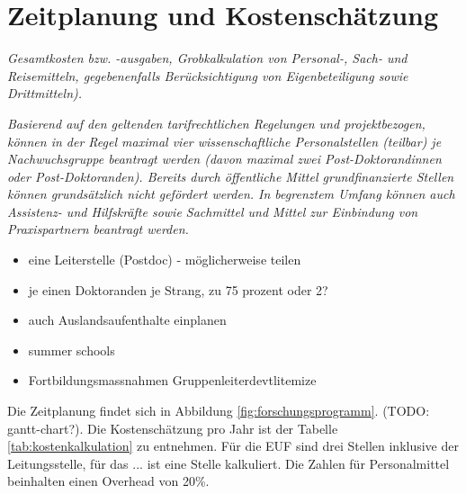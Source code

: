 \documentclass[a4paper,11pt,twoside]{scrartcl}
\begin{document}
\section{Zeitplanung und Kostenschätzung}
\textit{Gesamtkosten bzw. -ausgaben, Grobkalkulation von Personal-, Sach- und Reisemitteln, gegebenenfalls Berücksichtigung von Eigenbeteiligung sowie Drittmitteln).}

\textit{Basierend auf den geltenden tarifrechtlichen Regelungen und projektbezogen, können in der Regel maximal vier wissenschaftliche Personalstellen (teilbar) je Nachwuchsgruppe beantragt werden (davon maximal zwei Post-Doktorandinnen oder Post-Doktoranden). Bereits durch öffentliche Mittel grundfinanzierte Stellen können grundsätzlich nicht gefördert werden.
In begrenztem Umfang können auch Assistenz- und Hilfskräfte sowie Sachmittel und Mittel zur Einbindung von Praxispartnern beantragt werden.}
\begin{itemize}
    \item eine Leiterstelle (Postdoc) - möglicherweise teilen
    \item je einen Doktoranden je Strang, zu 75 prozent oder 2?
    \item auch Auslandsaufenthalte einplanen
    \item summer schools
    \item Fortbildungsmassnahmen Gruppenleiterd{evtlitemize}
\end{itemize}

Die Zeitplanung findet sich in Abbildung \ref{fig:forschungsprogramm}. (TODO: gantt-chart?). Die Kostenschätzung pro Jahr ist der Tabelle \ref{tab:kostenkalkulation} zu entnehmen. Für die EUF sind drei Stellen inklusive der Leitungsstelle, für das ... ist eine Stelle kalkuliert. Die Zahlen für Personalmittel beinhalten einen Overhead von 20\%.
\end{document}
